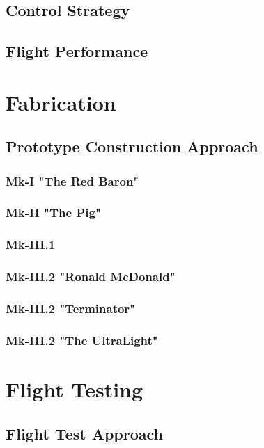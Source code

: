 \documentclass[11pt]{article}
\begin{document}
\subsection{Control Strategy}
\label{CtrlStr}
\subsection{Flight Performance}
\label{CtrlFlightPerf}


\section{Fabrication}
\label{Fabrication}
\subsection{Prototype Construction Approach}
\label{ProtoConsAppr}
\subsubsection{Mk-I "The Red Baron"}
\label{mk1}
\subsubsection{Mk-II "The Pig"}
\label{mk2}
\subsubsection{Mk-III.1}
\label{mk3.1}
\subsubsection{Mk-III.2 "Ronald McDonald"}
\label{mk3.2}
\subsubsection{Mk-III.2 "Terminator"}
\label{mk3.3}
\subsubsection{Mk-III.2 "The UltraLight"}
\label{mk3.4}

\section{Flight Testing}
\label{FlightTesting}
\subsection{Flight Test Approach}
\label{FltTstAppr}
\end{document}
